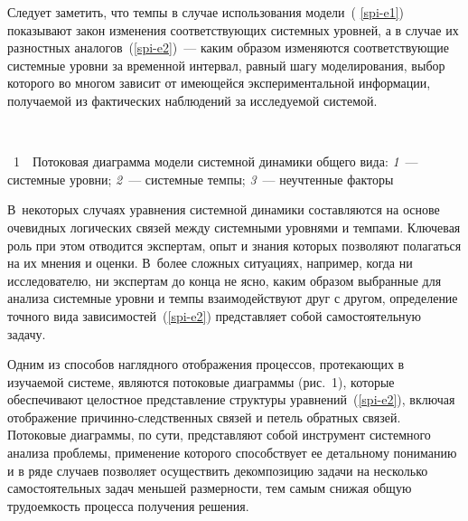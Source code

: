 {\begin{multicols}{2}
  Следует заметить, что темпы в случае использования модели~( \ref{spi-e1})
показывают закон изменения соответствующих системных уровней, а в случае
их разностных аналогов~(\ref{spi-e2})~--- каким образом изменяются
соответствующие системные уровни за временной интервал, равный шагу
моделирования, выбор которого во многом зависит от имеющейся
экспериментальной информации, получаемой из фактических наблюдений за
исследуемой системой.

\noindent
\begin{center}  %
\mbox{%
\epsfxsize=68.266mm
}
  \end{center}

  \vspace*{6pt}

\noindent
{{\figurename~1}\ \ \small{Потоковая диаграмма модели системной динамики общего вида:
\textit{1}~--- системные уровни;
\textit{2}~--- системные темпы;
\textit{3}~--- неучтенные факторы}}


\vspace*{9pt}

\addtocounter{figure}{1}



  В~некоторых случаях уравнения системной динамики составляются на основе
очевидных логических связей между системными уровнями и темпами.
Ключевая роль при этом отводится экспертам, опыт и знания которых
позволяют полагаться на их мнения и оценки. В~более сложных ситуациях,
например, когда ни исследователю, ни экспертам до конца не ясно, каким
образом выбранные для анализа системные уровни и темпы взаимодействуют
друг с другом, определение точного вида зависимостей~(\ref{spi-e2})
представляет собой самостоятельную задачу.

  Одним из способов наглядного отображения процессов, протекающих в
изучаемой системе, являются потоковые диаграммы (рис.~1), которые
обеспечивают целостное представление структуры уравнений~(\ref{spi-e2}),
включая отображение при\-чин\-но-след\-ст\-вен\-ных связей и петель обратных
связей. Потоковые диаграммы, по сути, представляют собой инструмент
системного анализа проблемы, применение которого способствует ее
детальному пониманию и в ряде случаев позволяет осуществить декомпозицию
задачи на несколько самостоятельных задач меньшей размерности, тем самым
снижая общую трудоемкость процесса получения ре\-шения.
{ %

}


\end{multicols}}
